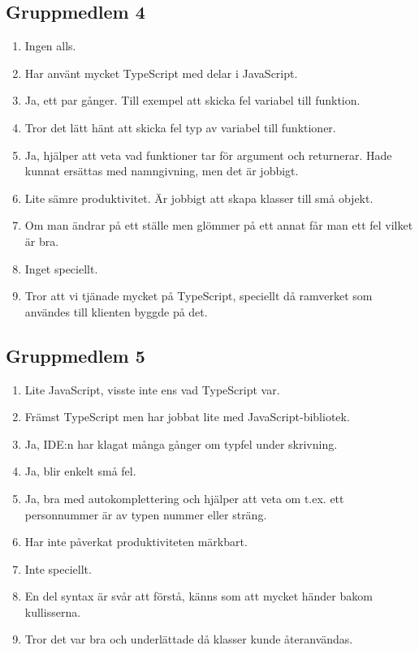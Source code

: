 \subsection{Gruppmedlem 4}
\begin{enumerate}
\item Ingen alls.
\item Har använt mycket TypeScript med delar i JavaScript.
\item Ja, ett par gånger. Till exempel att skicka fel variabel till funktion.
\item Tror det lätt hänt att skicka fel typ av variabel till funktioner.
\item Ja, hjälper att veta vad funktioner tar för argument och returnerar. Hade kunnat ersättas med namngivning, men det är jobbigt.
\item Lite sämre produktivitet. Är jobbigt att skapa klasser till små objekt.
\item Om man ändrar på ett ställe men glömmer på ett annat får man ett fel vilket är bra.
\item Inget speciellt.
\item Tror att vi tjänade mycket på TypeScript, speciellt då ramverket som användes till klienten byggde på det.
\end{enumerate}

\subsection{Gruppmedlem 5}
\begin{enumerate}
\item Lite JavaScript, visste inte ens vad TypeScript var.
\item Främst TypeScript men har jobbat lite med JavaScript-bibliotek.
\item Ja, IDE:n har klagat många gånger om typfel under skrivning.
\item Ja, blir enkelt små fel.
\item Ja, bra med autokomplettering och hjälper att veta om t.ex. ett personnummer är av typen nummer eller sträng.
\item Har inte påverkat produktiviteten märkbart.
\item Inte speciellt.
\item En del syntax är svår att förstå, känns som att mycket händer bakom kullisserna.
\item Tror det var bra och underlättade då klasser kunde återanvändas.
\end{enumerate}

 

